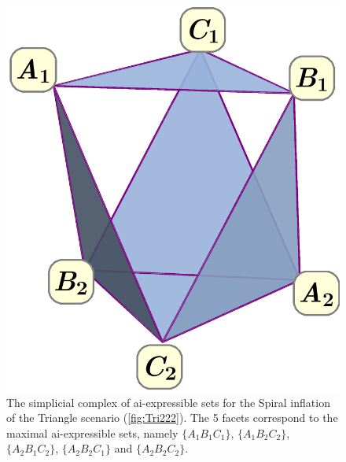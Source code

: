 \documentclass[aps,english,10pt,superscriptaddress,onecolumn,twoside,longbibliography,pra,floatfix,fleqn,nofootinbib]{revtex4-1}%
\theoremstyle{definition}
\begin{document}
\begin{figure}[t]
\begin{minipage}[t]{0.3\linewidth}
\includegraphics[scale=0.25]{simplicialcomplex.pdf}
\caption{The simplicial complex of ai-expressible sets for the  Spiral inflation of the Triangle scenario (\cref{fig:Tri222}). The 5 facets correspond to the maximal ai-expressible sets, namely $\{A_1 B_1 C_1\}$, $\{A_1 B_2 C_2\}$, $\{A_2 B_1 C_2\}$, $\{A_2 B_2 C_1\}$ and $\{A_2 B_2 C_2\}$.}\label{fig:simplicialcomplex222}
\end{minipage}
\end{figure}
\end{document}
